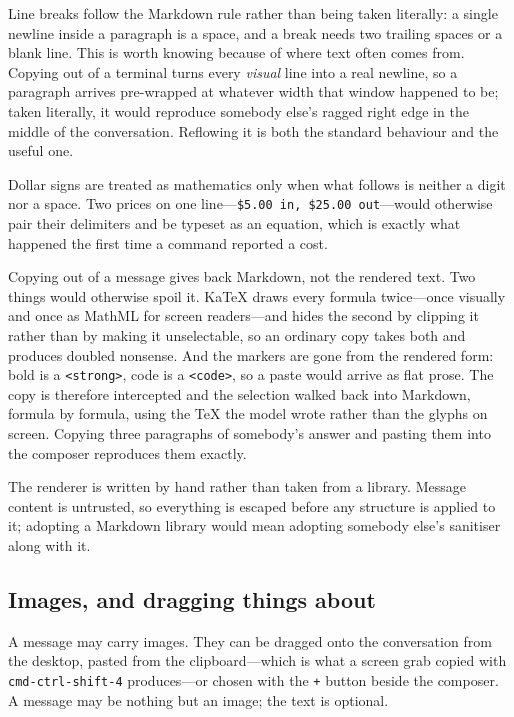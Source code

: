 \documentclass[11pt,letterpaper]{article}
\begin{document}
Line breaks follow the Markdown rule rather than being taken literally: a
single newline inside a paragraph is a space, and a break needs two trailing
spaces or a blank line. This is worth knowing because of where text often
comes from. Copying out of a terminal turns every \emph{visual} line into a
real newline, so a paragraph arrives pre-wrapped at whatever width that window
happened to be; taken literally, it would reproduce somebody else's ragged
right edge in the middle of the conversation. Reflowing it is both the
standard behaviour and the useful one.

Dollar signs are treated as mathematics only when what follows is neither a
digit nor a space. Two prices on one line---\texttt{\$5.00 in, \$25.00
out}---would otherwise pair their delimiters and be typeset as an equation,
which is exactly what happened the first time a command reported a cost.

Copying out of a message gives back Markdown, not the rendered text. Two
things would otherwise spoil it. KaTeX draws every formula twice---once
visually and once as MathML for screen readers---and hides the second by
clipping it rather than by making it unselectable, so an ordinary copy takes
both and produces doubled nonsense. And the markers are gone from the rendered
form: bold is a \texttt{<strong>}, code is a \texttt{<code>}, so a paste would
arrive as flat prose. The copy is therefore intercepted and the selection
walked back into Markdown, formula by formula, using the \TeX{} the model
wrote rather than the glyphs on screen. Copying three paragraphs of somebody's
answer and pasting them into the composer reproduces them exactly.

The renderer is written by hand rather than taken from a library. Message
content is untrusted, so everything is escaped before any structure is applied
to it; adopting a Markdown library would mean adopting somebody else's
sanitiser along with it.

\subsection{Images, and dragging things about}

A message may carry images. They can be dragged onto the conversation from the
desktop, pasted from the clipboard---which is what a screen grab copied with
\texttt{cmd-ctrl-shift-4} produces---or chosen with the \texttt{+} button
beside the composer. A message may be nothing but an image; the text is
optional.
\end{document}
